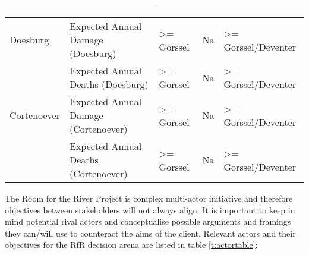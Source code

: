 \begin{table}[h!]
\begin{tabular}{ll|lll}
Doesburg    & Expected Annual Damage (Doesburg)    & \textgreater{}= Gorssel & Na & \textgreater{}= Gorssel/Deventer \\
            & Expected Annual Deaths (Doesburg)    & \textgreater{}= Gorssel & Na & \textgreater{}= Gorssel/Deventer \\
Cortenoever & Expected Annual Damage (Cortenoever) & \textgreater{}= Gorssel & Na & \textgreater{}= Gorssel/Deventer \\
            & Expected Annual Deaths (Cortenoever) & \textgreater{}= Gorssel & Na & \textgreater{}= Gorssel/Deventer
\end{tabular}
\caption{-}
\label{t:objectives}
\end{table}






The Room for the River Project is complex multi-actor initiative and therefore objectives between stakeholders will not always align. It is important to keep in mind potential rival actors and conceptualise possible arguments and framings they can/will use to counteract the aims of the client. Relevant actors and their objectives for the RfR decision arena are listed in table \ref{t:actortable}:

